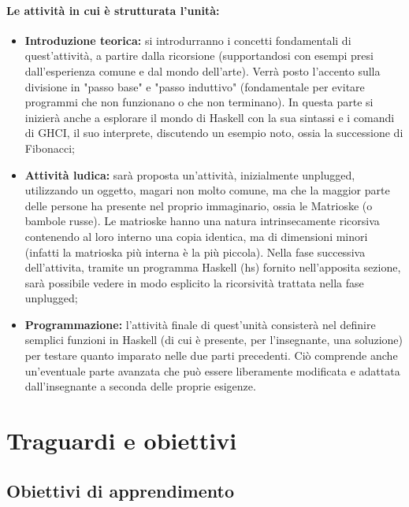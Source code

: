 \paragraph{Le attività in cui è strutturata l'unità:}

\begin{itemize}
    \item \textbf{Introduzione teorica:} si introdurranno i concetti fondamentali di quest'attività, a partire dalla ricorsione
    (supportandosi con esempi presi dall'esperienza comune e dal mondo dell'arte). Verrà posto l'accento 
    sulla divisione in "passo base" e "passo induttivo" (fondamentale per evitare programmi che non funzionano o che non terminano). 
    In questa parte si inizierà anche a esplorare
    il mondo di Haskell con la sua sintassi e i comandi di GHCI, il suo interprete, discutendo un esempio noto,
    ossia la successione di Fibonacci;
    \item \textbf{Attività ludica:} sarà proposta un'attività, inizialmente unplugged, utilizzando un oggetto, magari non molto comune, ma che
    la maggior parte delle persone ha presente nel proprio immaginario, ossia le Matrioske (o bambole russe). Le matrioske hanno
    una natura intrinsecamente ricorsiva contenendo al loro interno una copia identica, ma di dimensioni minori (infatti la matrioska più interna è la più piccola).
    Nella fase successiva dell'attivita, tramite un programma Haskell (hs) fornito nell'apposita sezione, sarà possibile vedere in modo esplicito la ricorsività trattata nella fase unplugged;
    \item \textbf{Programmazione:} l'attività finale di quest'unità consisterà nel definire semplici funzioni in Haskell (di cui è presente, per l'insegnante, una soluzione) per testare
    quanto imparato nelle due parti precedenti. Ciò comprende anche un'eventuale parte avanzata che può essere liberamente modificata e adattata dall'insegnante a seconda delle proprie esigenze.
\end{itemize}
\pagebreak
\section{Traguardi e obiettivi}

\subsection{Obiettivi di apprendimento}




